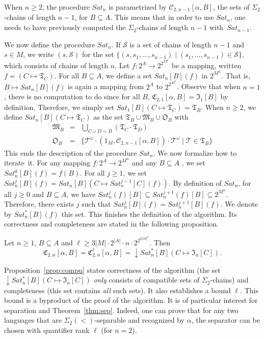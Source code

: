 \documentclass[envcountsame]{llncs}
\newcommand\Cs{\ensuremath{\mathcal{C}}\xspace}
\newcommand\Cstwolen[1]{\ensuremath{\Cs_{2,#1}}\xspace}
\newcommand\fCgen[3]{\ensuremath{\fC_{#1,#3}^{#2}}\xspace}
\newcommand\fCtwolen[1]{\ensuremath{\fC_{2,#1}}\xspace}
\newcommand\fCtwon{\ensuremath{\fC_{2,n}}\xspace}
\newcommand\Ss{\ensuremath{\mathcal{S}}\xspace}
\newcommand\Ts{\ensuremath{\mathcal{T}}\xspace}
\newcommand{\sic}[1]{\ensuremath{\Sigma_{#1}}\xspace}
\newcommand{\siwd}{\ensuremath{\Sigma_{2}(<)}\xspace}
\newcommand\gmo{\ensuremath{\geqslant}\xspace}
\let\geq\geqslant
\newcommand\chains{chains\xspace}
\newcommand\qchains[1]{\ensuremath{\sic{#1}}-chains\xspace}
\newcommand\dchains{\qchains{2}}
\newcommand\fI{\ensuremath{\mathfrak I}\xspace}
\newcommand\fM{\ensuremath{\mathfrak M}\xspace}
\newcommand\fC{\ensuremath{\mathfrak C}\xspace}
\newcommand\fO{\ensuremath{\mathfrak O}\xspace}
\newcommand\fT{\ensuremath{\mathfrak T}\xspace}
\DeclareMathOperator{\downclos}{\downarrow}
\begin{document}
When $n \gmo 2$, the procedure $Sat_n$ is parametrized by
$\Cstwolen{n-1}[\alpha,B]$, the sets of \dchains of length $n-1$, for $B
\subseteq A$. This means that in order to use $Sat_n$, one needs to have
previously computed the \dchains of length $n-1$ with~$Sat_{n-1}$.

\medskip
We now define the procedure $Sat_n$. If \Ss is a set of \chains of
length $n-1$ and $s \in M$, we write $(s,\Ss)$ for the set
$\{(s,s_1,\dots,s_{n-1}) \mid (s_1,\dots,s_{n-1}) \in \Ss\}$, which consists of
\chains of length $n$. Let $f:2^A\to2^{2^{M^n}}$ be a mapping, written $f=(C\mapsto\fT_C)$. For all $B \subseteq A$, we define a set
$Sat_n[B](f)$ in $2^{M^n}$. That is, $B \mapsto Sat_n[B](f)$ is again a mapping from
$2^A$ to $2^{2^{M^n}}$.
Observe that when $n = 1$,
there is no computation to do since for all $B$, $\fCtwolen1[\alpha,B] =
\fI_1[B]$ by definition. Therefore, we simply set $Sat_1[B](C \mapsto
\fT_C) = \fT_B$. When $n \gmo 2$, we define $Sat_n[B](C \mapsto
\fT_C)$ as the set $\fT_B \cup \fM_B \cup \fO_B$ with
\begin{eqnarray} 
  \fM_B & = & \bigcup_{C \cup D = B} (\fT_C \cdot \fT_D)\label{eq:mul} \\
  \fO_B & = & \big\{\Ts^\omega \cdot (1_M,\Cstwolen{n-1}[\alpha,B]) \cdot \Ts^{\omega} \mid \Ts \in
\fT_B\big\}\label{eq:oper}
\end{eqnarray}
This ends the description of the procedure $Sat_n$.
We now formalize how to iterate~it. For any mapping $f: 2^A \rightarrow 2^{M^n}$ and any $B \subseteq A$ ,
we set $Sat^0_n[B](f) = f(B)$. For all $j \geq 1$, we set
$Sat^{j}_{n}[B](f) = Sat_n[B](C \mapsto Sat^{j-1}_n[C](f))$. By
definition of $Sat_n$, for all $j \gmo 0$ and $B \subseteq A$, we have
$Sat^j_n(f)[B] \subseteq Sat^{j+1}_n(f)[B] \subseteq
2^{M^n}$. Therefore, there exists $j$ such that $Sat^{j}_n[B](f) =
Sat^{j+1}_n[B](f)$. We denote by $Sat^{*}_n[B](f)$ this set. This
finishes the definition of the algorithm. Its correctness 
and completeness are stated in the following proposition. 

\begin{proposition} \label{prop:compu}
  Let $n \gmo 1$, $B \subseteq A$ and $\ell \gmo 3|M| \cdot
  2^{|A|}\cdot n \cdot 2^{2^{2|M|^n}}$. Then $$\fCtwon[\alpha,B] = 
  \fCgen{2}{\ell}{n}[\alpha,B] = \downclos Sat^{*}_n[B](C \mapsto \fI_n[C]).$$
\end{proposition} 
\noindent
Proposition~\ref{prop:compu} states correctness of the algorithm (the set
$\downclos Sat^{*}_n[B](C \mapsto \fI_n[C])$ \emph{only} consists of
compatible sets of \dchains) and completeness (this set contains \emph{all}
such sets). It also establishes a bound $\ell$. This bound is a byproduct of
the proof of the algorithm. It is of particular interest for separation and
Theorem~\ref{thm:sep}. Indeed, one can prove that for any two languages that are
\siwd-separable and recognized by $\alpha$, the separator can be chosen with
quantifier rank $\ell$ (for $n = 2$).
\end{document}
